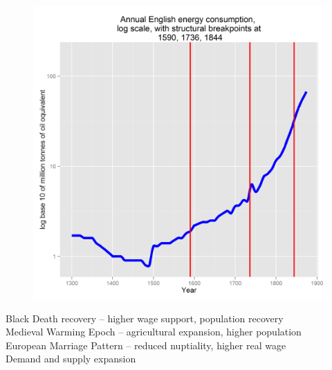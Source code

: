 \documentclass[final]{beamer}
\begin{document}
\begin{frame}
\begin{figure}[p!]
{		\mbox{\includegraphics[height=0.5\textheight]{energyLog1}}
		}
		\end{figure} \vspace*{-0.4in}
Black Death recovery -- higher wage support, population recovery\\
Medieval Warming Epoch -- agricultural expansion, higher population\\
European Marriage Pattern -- reduced nuptiality, higher real wage\\
Demand and supply expansion\\
\end{frame}
\end{document}
